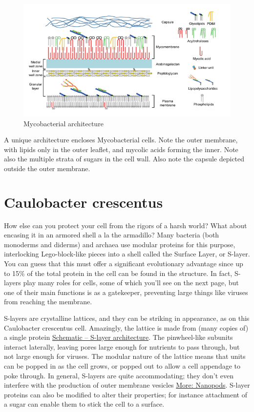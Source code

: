 \documentclass[]{tufte-book}
\begin{document}
\begin{figure}
\includegraphics{img/02_schematic/2_5_1_Mycobacteria} \caption[Mycobacterial architecture]{Mycobacterial architecture}\label{fig:2-5-1}
\end{figure}

A unique architecture encloses Mycobacterial cells. Note the outer
membrane, with lipids only in the outer leaflet, and mycolic acids
forming the inner. Note also the multiple strata of sugars in the cell
wall. Also note the capsule depicted outside the outer membrane.

\section{Caulobacter crescentus}\label{caulobacter-crescentus}

How else can you protect your cell from the rigors of a harsh world?
What about encasing it in an armored shell a la the armadillo? Many
bacteria (both monoderms and diderms) and archaea use modular proteins
for this purpose, interlocking Lego-block-like pieces into a shell
called the Surface Layer, or S-layer. You can guess that this must offer
a significant evolutionary advantage since up to 15\% of the total
protein in the cell can be found in the structure. In fact, S-layers
play many roles for cells, some of which you'll see on the next page,
but one of their main functions is as a gatekeeper, preventing large
things like viruses from reaching the membrane.

S-layers are crystalline lattices, and they can be striking in
appearance, as on this Caulobacter crescentus cell. Amazingly, the
lattice is made from (many copies of) a single protein
\protect\hyperlink{fig:2-6-1}{Schematic -- S-layer architecture}. The
pinwheel-like subunits interact laterally, leaving pores large enough
for nutrients to pass through, but not large enough for viruses. The
modular nature of the lattice means that units can be popped in as the
cell grows, or popped out to allow a cell appendage to poke through. In
general, S-layers are quite accommodating; they don't even interfere
with the production of outer membrane vesicles
\protect\hyperlink{Nanopods}{More: Nanopods}. S-layer proteins can also
be modified to alter their properties; for instance attachment of a
sugar can enable them to stick the cell to a surface.
\end{document}
